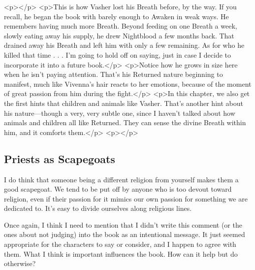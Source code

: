<p></p>
<p>This is how Vasher lost his Breath before, by the way. If you recall, he began the book with barely enough to Awaken in weak ways. He remembers having much more Breath. Beyond feeding on one Breath a week, slowly eating away his supply, he drew Nightblood a few months back. That drained away his Breath and left him with only a few remaining. As for who he killed that time . . . I’m going to hold off on saying, just in case I decide to incorporate it into a future book.</p>
<p>Notice how he grows in size here when he isn’t paying attention. That’s his Returned nature beginning to manifest, much like Vivenna’s hair reacts to her emotions, because of the moment of great passion from him during the fight.</p>
<p>In this chapter, we also get the first hints that children and animals like Vasher. That’s another hint about his nature—though a very, very subtle one, since I haven’t talked about how animals and children all like Returned. They can sense the divine Breath within him, and it comforts them.</p>
<p></p>

\subsection*{Priests as Scapegoats}

I do think that someone being a different religion from yourself makes them a good scapegoat. We tend to be put off by anyone who is too devout toward religion, even if their passion for it mimics our own passion for something we are dedicated to. It’s easy to divide ourselves along religious lines.

Once again, I think I need to mention that I didn’t write this comment (or the ones about not judging) into the book as an intentional message. It just seemed appropriate for the characters to say or consider, and I happen to agree with them. What I think is important influences the book. How can it help but do otherwise?



